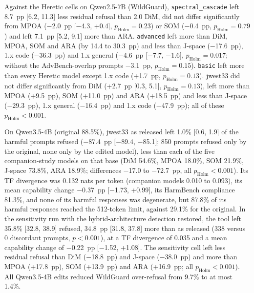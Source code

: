 Against the Heretic cells on Qwen2.5-7B (WildGuard), \texttt{spectral\_cascade} left 8.7~pp [6.2, 11.3] less residual
refusal than 2.0 DiM, did not differ significantly from MPOA ($-$2.0~pp [$-$4.3, +0.4], $p_\mathrm{Holm}=0.23$) or
SOM ($-$0.4~pp, $p_\mathrm{Holm}=0.79$) and left 7.1~pp [5.2, 9.1] more than ARA. \texttt{advanced} left more than
DiM, MPOA, SOM and ARA (by 14.4 to 30.3~pp) and less than J-space ($-$17.6~pp), 1.x code ($-$36.3~pp) and 1.x
general ($-$4.6~pp [$-$7.7, $-$1.6], $p_\mathrm{Holm}=0.017$; without the AdvBench-overlap prompts $-$3.1~pp,
$p_\mathrm{Holm}=0.15$).
\texttt{basic} left more than every Heretic model except 1.x code (+1.7~pp, $p_\mathrm{Holm}=0.13$). jwest33 did not
differ significantly from DiM (+2.7~pp [0.3, 5.1], $p_\mathrm{Holm}=0.13$), left more than MPOA (+9.5~pp), SOM
(+11.0~pp) and ARA (+18.5~pp) and less than J-space ($-$29.3~pp), 1.x general ($-$16.4~pp) and 1.x code
($-$47.9~pp); all of these $p_\mathrm{Holm}<0.001$.

On Qwen3.5-4B (original 88.5\%), jwest33 as released left 1.0\% [0.6, 1.9] of the harmful prompts refused
($-$87.4~pp [$-$89.4, $-$85.1]; 850 prompts refused only by the original, none only by the edited model), less than
each of the five companion-study models on that base (DiM 54.6\%, MPOA 18.0\%, SOM 21.9\%, J-space 73.8\%, ARA
18.9\%; differences $-$17.0 to $-$72.7~pp, all $p_\mathrm{Holm}<0.001$). Its TF divergence was 0.132 nats per token
(companion models 0.010 to 0.093), its mean capability change $-$0.37~pp [$-$1.73, +0.99], its HarmBench compliance
81.3\%, and none of its harmful responses was degenerate, but 87.8\% of its harmful responses reached the 512-token limit,
against 29.1\% for the original. In the sensitivity run with the hybrid-architecture detection restored, the tool left
35.8\% [32.8, 38.9] refused, 34.8~pp [31.8, 37.8] more than as released (338 versus 0 discordant prompts,
$p<0.001$), at a TF divergence of 0.035 and a mean capability change of $-$0.22~pp [$-$1.52, +1.08]. The sensitivity
cell left less residual refusal than DiM ($-$18.8~pp) and J-space ($-$38.0~pp) and more than MPOA (+17.8~pp), SOM
(+13.9~pp) and ARA (+16.9~pp; all $p_\mathrm{Holm}<0.001$). All Qwen3.5-4B edits reduced WildGuard over-refusal from
9.7\% to at most 1.4\%.

